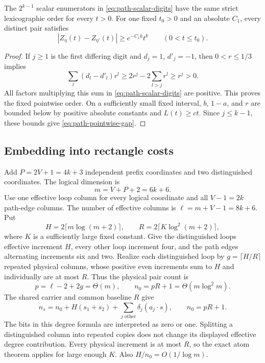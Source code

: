 \begin{lemma}
\label{lem:path-pointwise-order}
The $2^{k-1}$ scalar enumerators in
\eqref{eq:path-scalar-digits} have the same strict lexicographic order
for every $t>0$. For one fixed $t_0>0$ and an absolute $C_1$, every
distinct pair satisfies
\begin{equation}\label{eq:path-pointwise-gap}
 |Z_\eta(t)-Z_{\eta'}(t)|\ge e^{-C_1k}t^k
 \qquad(0<t\le t_0).
\end{equation}
\end{lemma}
\begin{proof}
If $j\ge1$ is the first differing digit and $d_j=1$, $d'_j=-1$,
then $0<r\le1/3$ implies
\[
 \sum_l(d_l-d'_l)r^l
 \ge2r^j-2\sum_{l>j}r^l\ge r^j>0.
\]
All factors multiplying this sum in \eqref{eq:path-scalar-digits}
are positive. This proves the fixed pointwise order. On a sufficiently
small fixed interval, $b$, $1-a$, and $r$ are bounded below by positive
absolute constants and $L(t)\ge ct$. Since $j\le k-1$, these bounds
give \eqref{eq:path-pointwise-gap}.
\end{proof}

\subsection{Embedding into rectangle costs}

Add $P=2V+1=4k+3$ independent prefix coordinates and two distinguished
coordinates. The logical dimension is
\[
 m=V+P+2=6k+6.
\]
Use one effective loop column for every logical coordinate and all
$V-1=2k$ path-edge columns. The number of effective columns is
$\ell=m+V-1=8k+6$. Put
\[
 H=2\lceil m\log(m+2)\rceil,\qquad
 R=2\lceil K\log^2(m+2)\rceil,
\]
where $K$ is a sufficiently large fixed constant. Give the distinguished
loops effective increment $H$, every other loop increment four, and
the path edges alternating increments six and two. Realize each
distinguished loop by $g=\lceil H/R\rceil$ repeated physical columns,
whose positive even increments sum to $H$ and individually are at
most $R$. Thus the physical pair count is
\[
 p=\ell-2+2g=\Theta(m),\qquad
 n_0=pR+1=\Theta(m\log^2m).
\]
The shared carrier and common baseline $R$ give
\[
 n_s=n_0+H(s_1+s_2)
       +\sum_{j\text{ other}}\delta_j(a_j\cdot s),
 \qquad n_0=pR+1.
\]
The bits in this degree formula are interpreted as zero or one.
Splitting a distinguished column into repeated copies does not change
its displayed effective degree contribution. Every physical increment
is at most $R$, so the exact atom theorem applies for large enough
$K$. Also $H/n_0=O(1/\log m)$.

